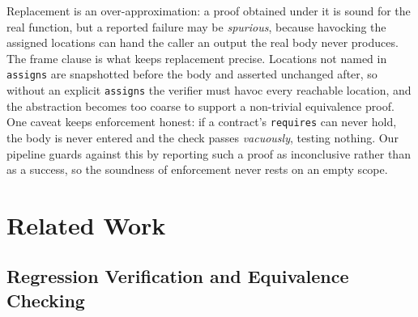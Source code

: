 \documentclass[conference]{IEEEtran}
\theoremstyle{definition}
\theoremstyle{remark}
\begin{document}
Replacement is an
over-approximation: a proof obtained under it is sound for the real
function, but a reported failure may be \emph{spurious}, because
havocking the assigned locations can hand the caller an output the real
body never produces. The frame clause is what keeps replacement precise.
Locations not named in \texttt{assigns} are snapshotted before the body
and asserted unchanged after, so without an explicit \texttt{assigns} the
verifier must havoc every reachable location, and the abstraction becomes
too coarse to support a non-trivial equivalence proof. One caveat keeps
enforcement honest: if a contract's \texttt{requires} can never hold, the
body is never entered and the check passes \emph{vacuously}, testing
nothing. Our pipeline guards against this by reporting such a proof as
inconclusive rather than as a success, so the soundness of enforcement
never rests on an empty scope.

\section{Related Work}\label{sec:related}

\subsection{Regression Verification and Equivalence Checking}
\end{document}

